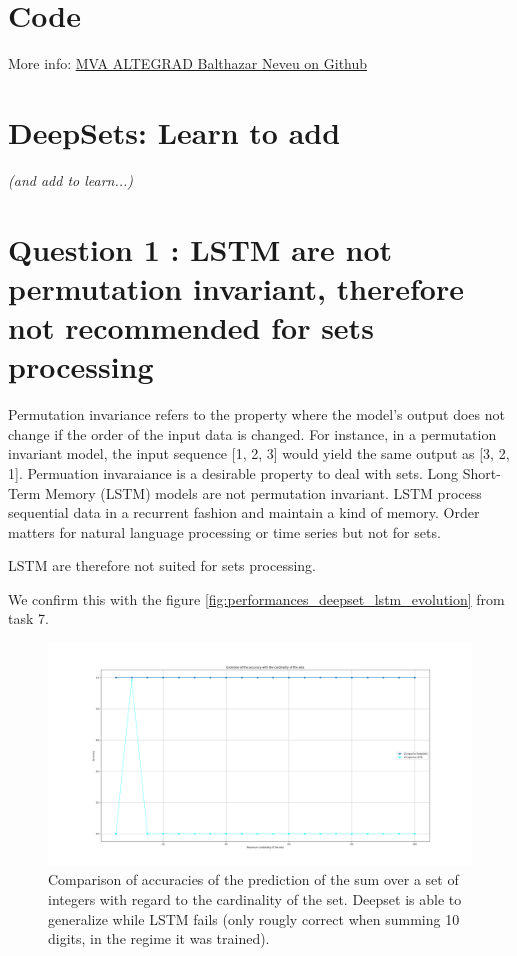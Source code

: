 \documentclass[a4paper]{article}
\begin{document}

\section*{Code}

More info:
\href{https://github.com/balthazarneveu/MVA23_ALTEGRAD/#readme}{MVA ALTEGRAD Balthazar Neveu on Github}

\section{DeepSets: Learn to add}
\textit{(and add to learn...)}
\section*{Question 1 : LSTM are not permutation invariant, therefore not recommended for sets processing}
Permutation invariance refers to the property where the model's output does not change if the order of the input data is changed. For instance, in a permutation invariant model, the input sequence [1, 2, 3] would yield the same output as [3, 2, 1]. Permuation invaraiance is a desirable property to deal with sets.
\newline
Long Short-Term Memory (LSTM) models are not permutation invariant. LSTM process sequential data in a recurrent fashion and maintain a kind of memory. Order matters for natural language processing or time series but not for sets. 

LSTM are therefore not suited for sets processing.
\newline



We confirm this with the figure \ref{fig:performances_deepset_lstm_evolution} from task 7.

\begin{figure}[h]
    \centering
    \includegraphics[width=1.\textwidth]{figures/deep_set_performances.png}
    \caption{Comparison of accuracies of the prediction of the sum over a set of integers with regard to the cardinality of the set. Deepset is able to generalize while LSTM fails (only rougly correct when summing 10 digits, in the regime it was trained).}
    \label{fig:performances_deepset_lstm}
\end{figure}
\end{document}
